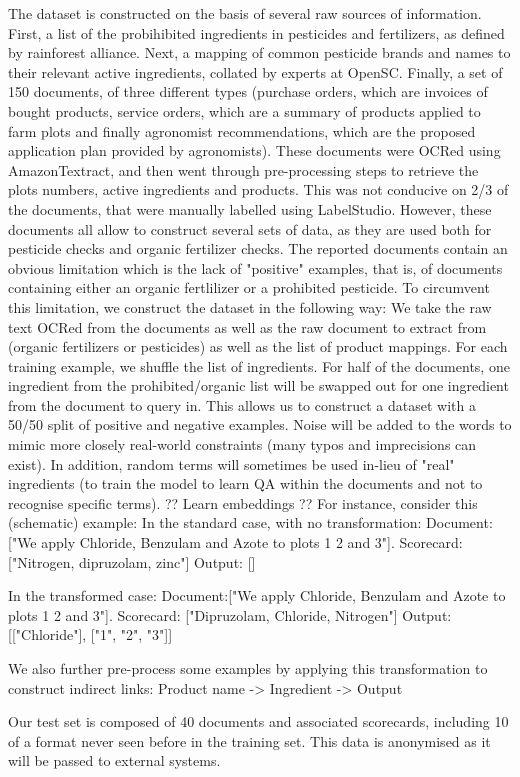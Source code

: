 The dataset is constructed on the basis of several raw sources of information.
First, a list of the probihibited ingredients in pesticides and fertilizers, as defined by rainforest alliance.
Next, a mapping of common pesticide brands and names to their relevant active ingredients, collated by experts at OpenSC.
Finally, a set of 150 documents, of three different types (purchase orders, which are invoices of bought products, 
service orders, which are a summary of products applied to farm plots and finally agronomist recommendations, which are
the proposed application plan provided by agronomists). These documents were OCRed using AmazonTextract, and then 
went through pre-processing steps to retrieve the plots numbers, active ingredients and products. This was not 
conducive on 2/3 of the documents, that were manually labelled using LabelStudio. 
However, these documents all allow to construct several sets of data, as they are used both for pesticide checks 
and organic fertilizer checks. 
The reported documents contain an obvious limitation which is the lack of "positive" examples, that is, of documents
containing either an organic fertlilizer or a prohibited pesticide. 
To circumvent this limitation, we construct the dataset in the following way:
We take the raw text OCRed from the documents as well as the raw document to extract from (organic fertilizers or pesticides) as
well as the list of product mappings. 
For each training example, we shuffle the list of ingredients. 
For half of the documents, one ingredient from the prohibited/organic list will be swapped out for one ingredient from 
the document to query in. This allows us to construct a dataset with a 50/50 split of positive and negative examples.
Noise will be added to the words to mimic more closely real-world constraints (many typos and imprecisions can exist).
In addition, random terms will sometimes be used in-lieu of "real" ingredients (to train the model to learn 
QA within the documents and not to recognise specific terms).
?? Learn embeddings ??
For instance, consider this (schematic) example:
In the standard case, with no transformation: 
Document:["We apply Chloride, Benzulam and Azote to plots 1 2 and 3"]. 
Scorecard: ["Nitrogen, dipruzolam, zinc"]
Output: []

In the transformed case: 
Document:["We apply Chloride, Benzulam and Azote to plots 1 2 and 3"]. 
Scorecard: ["Dipruzolam, Chloride, Nitrogen"]
Output: [["Chloride"], ["1", "2", "3"]]

We also further pre-process some examples by applying this transformation to construct indirect links:
Product name -> Ingredient -> Output

Our test set is composed of 40 documents and associated scorecards, including 10 of a format never seen before in the training set. This data is 
anonymised as it will be passed to external systems. 